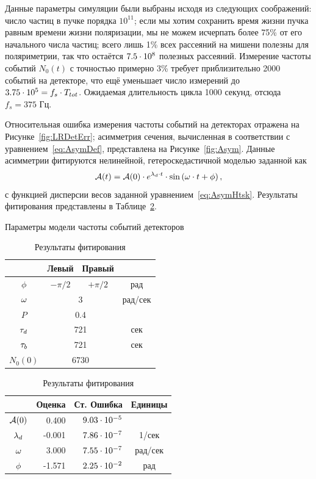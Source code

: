 Данные параметры симуляции были выбраны исходя из следующих
соображений: число частиц в пучке порядка $10^{11}$; если мы хотим
сохранить время жизни пучка равным времени жизни поляризации, мы не
можем исчерпать более 75\% от его начального числа частиц; всего лишь
1\% всех рассеяний на мишени полезны для поляриметрии, так что
остаётся ${7.5}\cdot 10^{8}$ полезных рассеяний. Измерение частоты событий
$N_0(t)$ с точностью примерно 3\% требует приблизительно 2000 событий
на детекторе, что ещё уменьшает число измерений до ${3.75}\cdot 10^{5}=
f_s\cdot T_{tot}$. Ожидаемая длительность цикла 1000 секунд, отсюда $f_s = 375$ Гц. 

Относительная ошибка измерения частоты событий на детекторах отражена на
Рисунке~\ref{fig:LRDetErr}; асимметрия сечения, вычисленная в
соответствии с уравнением~\eqref{eq:AsymDef}, представлена на Рисунке~\ref{fig:Asym}.
Данные асимметрии фитируются нелинейной, гетероскедастичной моделью
заданной как
\[
\Asym(t) = \Asym(0)\cdot e^{\lamd\cdot t}\cdot\sin\bkt{\w\cdot t + \phi},
\]
с функцией дисперсии весов заданной
уравнением~\eqref{eq:AsymHtsk}. Результаты фитирования представлены в Таблице~\ref{tbl:FitRes}.
\begin{table}[h]
	\begin{minipage}[t]{.5\linewidth}
		\centering
		\caption{Параметры модели частоты событий детекторов\label{tbl:DetCntRtParam}}
		\begin{tabular}[t]{cccc}
			\toprule
			&   Левый   &     Правый     &  \\ 
			\midrule
			$\phi$  & $-\pi/2$ &   $+\pi/2$    &   рад   \\
			$\omega$ &  \multicolumn{2}{c}{3}   & рад/сек \\
			$P$    & \multicolumn{2}{c}{0.4}  &  \\
			$\tau_d$  & \multicolumn{2}{c}{721}  &   сек   \\
			$\tau_b$  & \multicolumn{2}{c}{721}  &   сек   \\
			$N_0(0)$ & \multicolumn{2}{c}{6730} &  \\ 
			\bottomrule
		\end{tabular}
	\end{minipage}%
	\begin{minipage}[t]{.5\linewidth}
		\centering
		\caption{Результаты фитирования\label{tbl:FitRes}}
		\begin{tabular}[t]{crrc}
			\toprule
			& Оценка &             Ст. Ошибка &  Единицы   \\ 
			\midrule
			$\mathcal{A}(0)$ &   0.400 & ${9.03}\cdot 10^{-5}$ &         \\
			$\lambda_d$   &  -0.001 & ${7.86}\cdot 10^{-7}$ &  1/сек  \\
			$\omega$  &   3.000 & ${7.55}\cdot 10^{-7}$ & рад/сек \\
			$\phi$   &  -1.571 & ${2.25}\cdot 10^{-2}$ &   рад   \\ 
			\bottomrule
		\end{tabular}
	\end{minipage}
\end{table}

